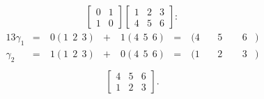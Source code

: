 \documentclass[12pt]{article}
\begin{document}
\begin{exm}
  \begin{align*}
    \begin{bmatrix}
      0 & 1\\
      1 & 0
    \end{bmatrix}
    \begin{bmatrix}
      1 & 2 & 3\\
      4 & 5 & 6
    \end{bmatrix}:
  \end{align*}
  \begin{alignat*}{13}
    \gamma_1 &=&\ 0(1\ \ 2\ \ 3) &+&\ 1(4\ \ 5\ \ 6)
      &=&\ (4&\ &5&\ \ &6&)\\
    \gamma_2 &=&\ 1(1\ \ 2\ \ 3) &+&\ 0(4\ \ 5\ \ 6)
      &=&\ (1&\ &2&\ \ &3&)\\
  \end{alignat*}
  \begin{align*}
    \begin{bmatrix}
      4 & 5 & 6\\
      1 & 2 & 3
    \end{bmatrix}.
  \end{align*}
\end{exm}
\end{document}
